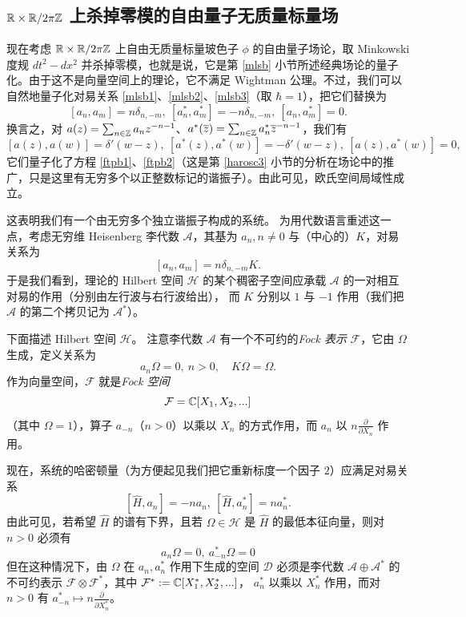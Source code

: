 \subsection{$\Bbb R\times \Bbb R/2\pi \Bbb Z$ 上杀掉零模的自由量子无质量标量场}

现在考虑 $\Bbb R\times \Bbb R/2\pi \Bbb Z$ 上自由无质量标量玻色子 $\phi$ 的自由量子场论，取 Minkowski 度规 $dt^2-dx^2$ 并杀掉零模，也就是说，它是第 \ref{mlsb} 小节所述经典场论的量子化。由于这不是向量空间上的理论，它不满足 Wightman 公理。不过，我们可以自然地量子化对易关系 \eqref{mlsb1}、\eqref{mlsb2}、\eqref{mlsb3}（取 $\hbar=1$），把它们替换为
$$
[a_n,a_m]=n\delta_{n,-m},\ [a_n^*,a_m^*]=-n\delta_{n,-m},\ [a_n,a_m^*]=0.
$$
换言之，对 $a(z)=\sum_{n\in \Bbb Z}a_nz^{-n-1}$、$a^*(\overline z)=\sum_{n\in \Bbb Z}a_n^*\overline z^{-n-1}$，我们有
$$
[a(z),a(w)]=\delta'(w-z),\ [a^*(z),a^*(w)]=-\delta'(w-z),\ [a(z),a^*(w)]=0,
$$
它们量子化了方程 \eqref{ftpb1}、\eqref{ftpb2}（这是第 \ref{harosc3} 小节的分析在场论中的推广，只是这里有无穷多个以正整数标记的谐振子）。由此可见，欧氏空间局域性成立。

这表明我们有一个由无穷多个独立谐振子构成的系统。
为用代数语言重述这一点，考虑无穷维 Heisenberg 李代数
$\mathcal A$，其基为 $a_n,n\ne 0$ 与（中心的）$K$，对易关系为
$$
[a_n,a_m]=n\delta_{n,-m}K.
$$
于是我们看到，理论的 Hilbert 空间 $\mathcal H$ 的某个稠密子空间应承载
$\mathcal A$ 的一对相互对易的作用（分别由左行波与右行波给出），
而 $K$ 分别以 $1$ 与 $-1$ 作用（我们把 $\mathcal A$ 的第二个拷贝记为 $\mathcal A^*$）。

下面描述 Hilbert 空间 $\mathcal H$。
注意李代数 $\mathcal A$ 有一个不可约的\emph{Fock 表示}
$\mathcal F$，它由 $\Omega$ 生成，定义关系为
$$
a_n\Omega=0,\ n>0,\quad K\Omega=\Omega.
$$ 
作为向量空间，$\mathcal F$ 就是\emph{Fock 空间}
$$
\mathcal F=\Bbb C[X_1,X_2,...]
$$ 
（其中 $\Omega=1$），算子
$a_{-n}$（$n>0$）以乘以 $X_n$ 的方式作用，而 $a_n$
以 $n\frac{\partial}{\partial X_n}$ 作用。

现在，系统的哈密顿量（为方便起见我们把它重新标度一个因子 $2$）应满足对易关系
$$
[\widehat H,a_n]=-na_n,\ [\widehat H,a_n^*]=na_n^*.
$$
由此可见，若希望 $\widehat H$ 的谱有下界，且若 $\Omega\in \mathcal H$
是 $\widehat H$ 的最低本征向量，则对 $n>0$ 必须有
$$
a_n\Omega=0,\ a_{-n}^*\Omega=0
$$
但在这种情况下，由 $\Omega$ 在 $a_n,a_n^*$ 作用下生成的空间 $\mathcal D$ 必须是李代数 $\mathcal A\oplus \mathcal A^*$ 的不可约表示
$\mathcal F\otimes \mathcal F^*$，其中
$\mathcal F^*:=\Bbb C[X_1^*,X_2^*,...]$，
$a_n^*$ 以乘以 $X_n^*$ 作用，而对 $n>0$ 有 $a_{-n}^*\mapsto n\frac{\partial}{\partial X_n^*}$。

